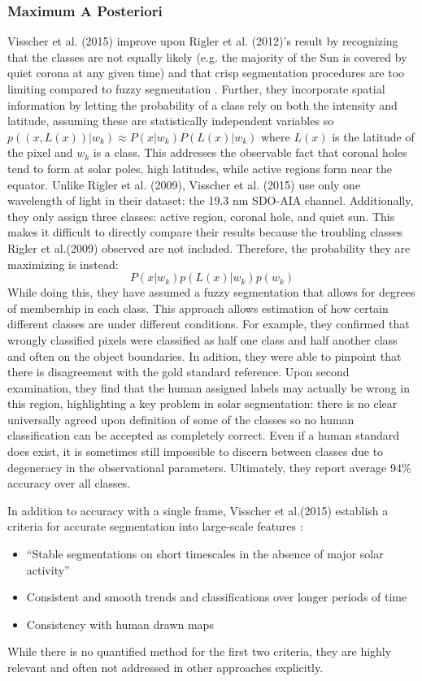 \documentclass[twoside]{report}
\begin{document}
\subsubsection{Maximum A Posteriori}
Visscher et al. (2015) improve upon Rigler et al. (2012)'s result by recognizing that the classes are not equally likely (e.g. the majority of the Sun is covered by quiet corona at any given time) and that crisp segmentation procedures are too limiting compared to fuzzy segmentation \cite{visscher:2015}. Further, they incorporate spatial information by letting the probability of a class rely on both the intensity and latitude, assuming these are statistically independent variables so $p((x, L(x)) | w_k) \approx P(x|w_k) P(L(x)|w_k)$ where $L(x)$ is the latitude of the pixel and $w_k$ is a class. This addresses the observable fact that coronal holes tend to form at solar poles, high latitudes, while active regions form near the equator. Unlike Rigler et al. (2009), Visscher et al. (2015) use only one wavelength of light in their dataset: the 19.3 nm SDO-AIA channel. Additionally, they only assign three classes: active region, coronal hole, and quiet sun. This makes it difficult to directly compare their results because the troubling classes Rigler et al.(2009) observed are not included.  Therefore, the probability they are maximizing is instead: 
\[P(x|w_k)p(L(x) | w_k) p(w_k) \]
While doing this, they have assumed a fuzzy segmentation that allows for degrees of membership in each class. This approach allows estimation of how certain different classes are under different conditions. For example, they confirmed that wrongly classified pixels were classified as half one class and half another class and often on the object boundaries. In adition, they were able to pinpoint that there is disagreement with the gold standard reference. Upon second examination, they find that the human assigned labels may actually be wrong in this region, highlighting a key problem in solar segmentation: there is no clear universally agreed upon definition of some of the classes so no human classification can be accepted as completely correct. Even if a human standard does exist, it is sometimes still impossible to discern between classes due to degeneracy in the observational parameters. Ultimately, they report average 94\% accuracy over all classes.

In addition to accuracy with a single frame, Visscher et al.(2015) establish a criteria for accurate segmentation into large-scale features \cite{visscher:2015}:
\begin{itemize}
\item ``Stable segmentations on short timescales in the absence of major solar activity''
\item Consistent and smooth trends and classifications over longer periods of time
\item Consistency with human drawn maps
\end{itemize}
While there is no quantified method for the first two criteria, they are highly relevant and often not addressed in other approaches explicitly. 
\end{document}
